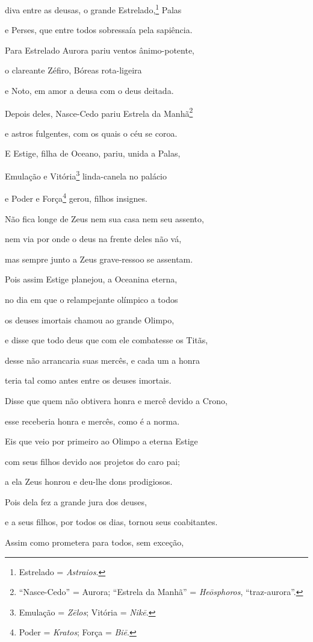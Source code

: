 \begin{pages}
\begin{Rightside}
diva entre as deusas, o grande Estrelado,\footnote{Estrelado = \emph{Astraios}.} Palas

e Perses, que entre todos sobressaía pela sapiência.

Para Estrelado Aurora pariu ventos ânimo-potente,

o clareante Zéfiro, Bóreas rota-ligeira

e Noto, em amor a deusa com o deus deitada. 

Depois deles, Nasce-Cedo pariu Estrela da Manhã\footnote{``Nasce-Cedo'' = Aurora; ``Estrela da Manhã'' = \emph{Heōsphoros}, ``traz-aurora''.}

e astros fulgentes, com os quais o céu se coroa.

\quad{}E Estige, filha de Oceano, pariu, unida a Palas,

Emulação e Vitória\footnote{Emulação = \emph{Zēlos}; Vitória = \emph{Nikē}.} linda-canela no palácio

e Poder e Força\footnote{Poder = \emph{Kratos}; Força = \emph{Biē}.} gerou, filhos insignes. 

Não fica longe de Zeus nem sua casa nem seu assento,

nem via por onde o deus na frente deles não vá,

mas sempre junto a Zeus grave-ressoo se assentam.

Pois assim Estige planejou, a Oceanina eterna,

no dia em que o relampejante olímpico a todos 

os deuses imortais chamou ao grande Olimpo,

e disse que todo deus que com ele combatesse os Titãs,

desse não arrancaria suas mercês, e cada um a honra

teria tal como antes entre os deuses imortais.

Disse que quem não obtivera honra e mercê devido a Crono, 

esse receberia honra e mercês, como é a norma.

Eis que veio por primeiro ao Olimpo a eterna Estige

com seus filhos devido aos projetos do caro pai;

a ela Zeus honrou e deu-lhe dons prodigiosos.

Pois dela fez a grande jura dos deuses, 

e a seus filhos, por todos os dias, tornou seus coabitantes.

Assim como prometera para todos, sem exceção,


\end{Rightside}
\end{pages}
